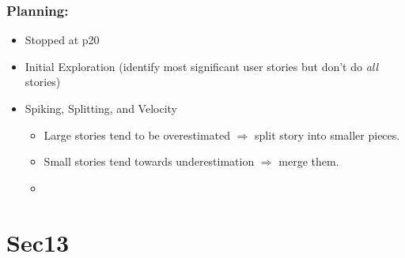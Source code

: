 \documentclass[11pt]{amsart}
\begin{document}
\subsubsection{Planning:}
\begin{itemize}
\item Stopped at p20 
\item Initial Exploration (identify most significant user stories but don't do \textit{all} stories)
\item Spiking, Splitting, and Velocity  
	\begin{itemize}
	\item Large stories tend to be overestimated $\Rightarrow$ split story into smaller pieces.
	\item Small stories tend towards underestimation $\Rightarrow$ merge them.
	\item 
	\end{itemize}
\end{itemize}

\section{Sec13}
\end{document}
